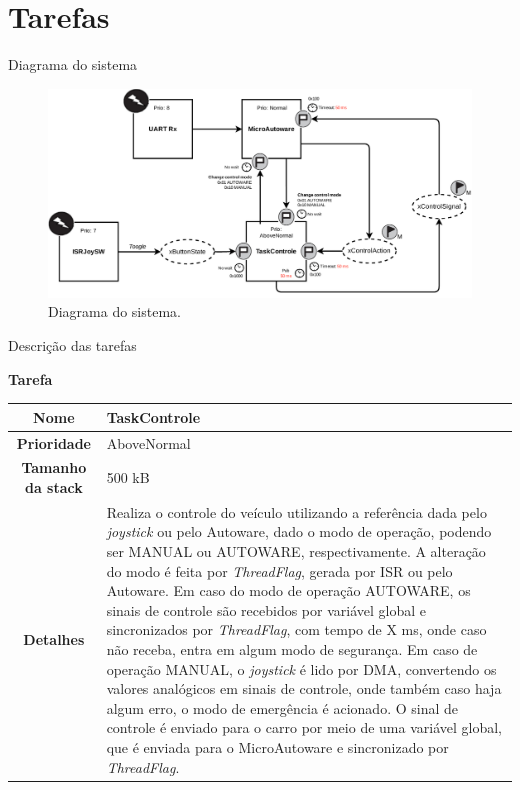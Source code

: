 \documentclass{if-beamer}
\begin{document}
\section{Tarefas}



\begin{frame}{Diagrama do sistema}
	
	\begin{figure}
		\centering
		\includegraphics[width=0.95\linewidth]{img/system_diagram}
		\caption{Diagrama do sistema.}
		\label{fig:systemdiagram}
	\end{figure}
	
\end{frame}



\begin{frame}{Descrição das tarefas}
	
\begin{block}{\textbf{Tarefa}}
	
	\centering
	
	\begin{tabular}{c|p{8cm}}
		\textbf{Nome} & TaskControle \\
		\hline
		\textbf{Prioridade}& AboveNormal \\
		\hline
		\textbf{Tamanho da stack} & 500 kB \\
		\hline
		\textbf{Detalhes} & Realiza o controle do veículo utilizando a referência dada pelo \textit{joystick} ou pelo Autoware, dado o modo de operação, podendo ser MANUAL ou AUTOWARE, respectivamente. A alteração do modo é feita por \textit{ThreadFlag}, gerada por ISR ou pelo Autoware. Em caso do modo de operação AUTOWARE, os sinais de controle são recebidos por variável global e sincronizados por \textit{ThreadFlag}, com tempo de X ms, onde caso não receba, entra em algum modo de segurança. Em caso de operação MANUAL,  o \textit{joystick} é lido por DMA, convertendo os valores analógicos em sinais de controle, onde também caso haja algum erro, o modo de emergência é acionado. O sinal de controle é enviado para o carro por meio de uma variável global, que é enviada para o MicroAutoware e sincronizado por \textit{ThreadFlag}. \\
	\end{tabular}
	
\end{block}	
	
\end{frame}
\end{document}
